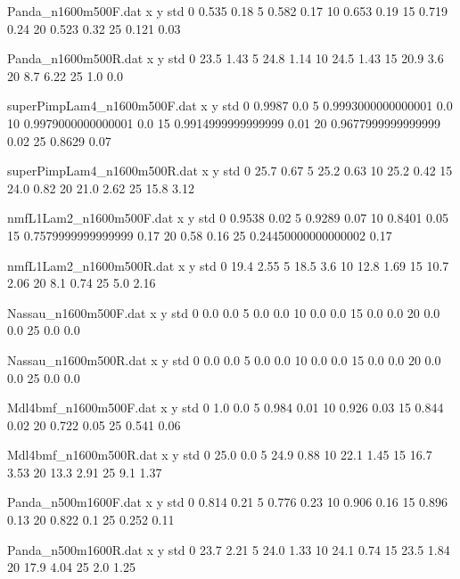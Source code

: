 \begin{filecontents}{Panda_n1600m500F.dat}
x y std
0 0.535 0.18
5 0.582 0.17
10 0.653 0.19
15 0.719 0.24
20 0.523 0.32
25 0.121 0.03
\end{filecontents}
\begin{filecontents}{Panda_n1600m500R.dat}
x y std
0 23.5 1.43
5 24.8 1.14
10 24.5 1.43
15 20.9 3.6
20 8.7 6.22
25 1.0 0.0
\end{filecontents}
\begin{filecontents}{superPimpLam4_n1600m500F.dat}
x y std
0 0.9987 0.0
5 0.9993000000000001 0.0
10 0.9979000000000001 0.0
15 0.9914999999999999 0.01
20 0.9677999999999999 0.02
25 0.8629 0.07
\end{filecontents}
\begin{filecontents}{superPimpLam4_n1600m500R.dat}
x y std
0 25.7 0.67
5 25.2 0.63
10 25.2 0.42
15 24.0 0.82
20 21.0 2.62
25 15.8 3.12
\end{filecontents}
\begin{filecontents}{nmfL1Lam2_n1600m500F.dat}
x y std
0 0.9538 0.02
5 0.9289 0.07
10 0.8401 0.05
15 0.7579999999999999 0.17
20 0.58 0.16
25 0.24450000000000002 0.17
\end{filecontents}
\begin{filecontents}{nmfL1Lam2_n1600m500R.dat}
x y std
0 19.4 2.55
5 18.5 3.6
10 12.8 1.69
15 10.7 2.06
20 8.1 0.74
25 5.0 2.16
\end{filecontents}
\begin{filecontents}{Nassau_n1600m500F.dat}
x y std
0 0.0 0.0
5 0.0 0.0
10 0.0 0.0
15 0.0 0.0
20 0.0 0.0
25 0.0 0.0
\end{filecontents}
\begin{filecontents}{Nassau_n1600m500R.dat}
x y std
0 0.0 0.0
5 0.0 0.0
10 0.0 0.0
15 0.0 0.0
20 0.0 0.0
25 0.0 0.0
\end{filecontents}
\begin{filecontents}{Mdl4bmf_n1600m500F.dat}
x y std
0 1.0 0.0
5 0.984 0.01
10 0.926 0.03
15 0.844 0.02
20 0.722 0.05
25 0.541 0.06
\end{filecontents}
\begin{filecontents}{Mdl4bmf_n1600m500R.dat}
x y std
0 25.0 0.0
5 24.9 0.88
10 22.1 1.45
15 16.7 3.53
20 13.3 2.91
25 9.1 1.37
\end{filecontents}
\begin{filecontents}{Panda_n500m1600F.dat}
x y std
0 0.814 0.21
5 0.776 0.23
10 0.906 0.16
15 0.896 0.13
20 0.822 0.1
25 0.252 0.11
\end{filecontents}
\begin{filecontents}{Panda_n500m1600R.dat}
x y std
0 23.7 2.21
5 24.0 1.33
10 24.1 0.74
15 23.5 1.84
20 17.9 4.04
25 2.0 1.25
\end{filecontents}
